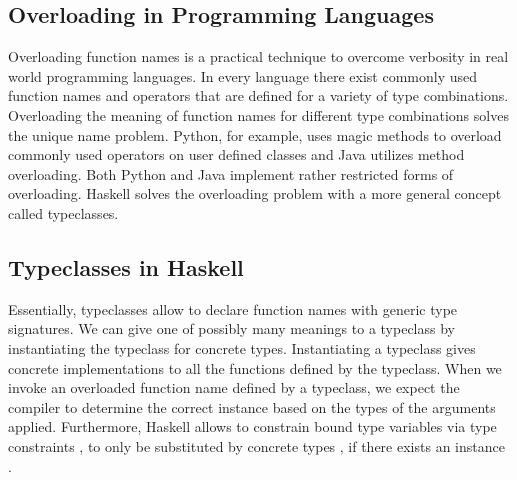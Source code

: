 \subsection{Overloading in Programming Languages}
Overloading function names is a practical technique to overcome verbosity in real world programming languages. 
In every language there exist commonly used function names and operators that are defined for a variety of type combinations.
Overloading the meaning of function names for different type combinations solves the unique name problem.
Python, for example, uses magic methods to overload commonly used operators on user defined classes and Java utilizes method overloading. Both Python and Java implement rather restricted forms of overloading. Haskell solves the overloading problem with a more general concept called typeclasses.

\subsection{Typeclasses in Haskell}
Essentially, typeclasses allow to declare function names with generic type signatures.
We can give one of possibly many meanings to a typeclass by instantiating the typeclass for concrete types. Instantiating a typeclass gives concrete implementations to all the functions defined by the typeclass.
When we invoke an overloaded function name defined by a typeclass, we expect the compiler to determine the correct instance based on the types of the arguments applied. 
Furthermore, Haskell allows to constrain bound type variables  via type constraints , to only be substituted by concrete types , if there exists an instance  .

